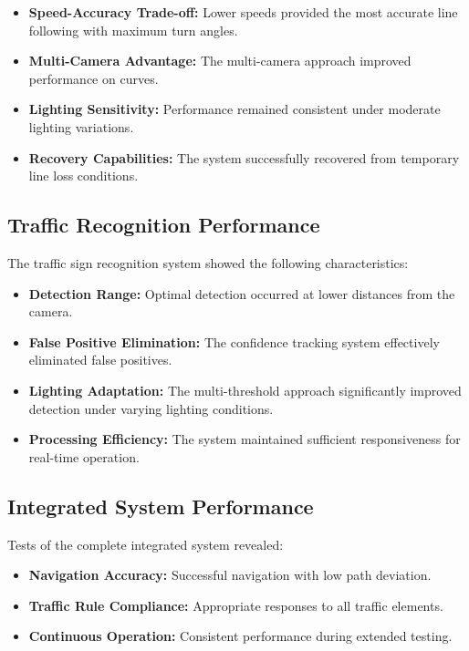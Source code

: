 \documentclass[9pt,technote]{IEEEtran}
\begin{document}
\begin{itemize}
    \item \textbf{Speed-Accuracy Trade-off:} Lower speeds provided the most accurate line following with maximum turn angles.
    \item \textbf{Multi-Camera Advantage:} The multi-camera approach improved performance on curves.
    \item \textbf{Lighting Sensitivity:} Performance remained consistent under moderate lighting variations.
    \item \textbf{Recovery Capabilities:} The system successfully recovered from temporary line loss conditions.
\end{itemize}

\subsection{Traffic Recognition Performance}
The traffic sign recognition system showed the following characteristics:

\begin{itemize}
    \item \textbf{Detection Range:} Optimal detection occurred at lower distances from the camera.
    \item \textbf{False Positive Elimination:} The confidence tracking system effectively eliminated false positives.
    \item \textbf{Lighting Adaptation:} The multi-threshold approach significantly improved detection under varying lighting conditions.
    \item \textbf{Processing Efficiency:} The system maintained sufficient responsiveness for real-time operation.
\end{itemize}

\subsection{Integrated System Performance}
Tests of the complete integrated system revealed:

\begin{itemize}
    \item \textbf{Navigation Accuracy:} Successful navigation with low path deviation.
    \item \textbf{Traffic Rule Compliance:} Appropriate responses to all traffic elements.
    \item \textbf{Continuous Operation:} Consistent performance during extended testing.
\end{itemize}
\end{document}
